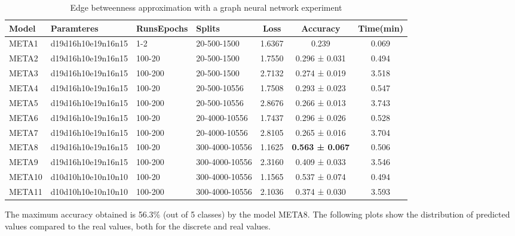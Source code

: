 \begin{table}[H]
\centering
\begin{tabular}{|llllccc|}
\hline
 Model &                                                                        Paramteres  &  Runs\/Epochs  &  Splits &    Loss &        Accuracy &  Time(min) \\
\hline
 META1 &          d19d16h10e19n16n15 & 1-2 & 20-500-1500 &  1.6367 &     0.239  &      0.069 \\
 META2 &       d19d16h10e19n16n15 & 100-20 & 20-500-1500 &  1.7550 &   0.296 ± 0.031 &      0.494 \\
 META3 &      d19d16h10e19n16n15 & 100-200 & 20-500-1500 &  2.7132 &   0.274 ± 0.019 &      3.518 \\
 META4 &      d19d16h10e19n16n15 & 100-20 & 20-500-10556 &  1.7508 &   0.293 ± 0.023 &      0.547 \\
 META5 &     d19d16h10e19n16n15 & 100-200 & 20-500-10556 &  2.8676 &   0.266 ± 0.013 &      3.743 \\
 META6 &     d19d16h10e19n16n15 & 100-20 & 20-4000-10556 &  1.7437 &   0.296 ± 0.026 &      0.528 \\
 META7 &    d19d16h10e19n16n15 & 100-200 & 20-4000-10556 &  2.8105 &   0.265 ± 0.016 &      3.704 \\
 META8 &    d19d16h10e19n16n15 & 100-20 & 300-4000-10556 &  1.1625 &   \textbf{0.563 ± 0.067} &      0.506 \\
 META9 &   d19d16h10e19n16n15 & 100-200 & 300-4000-10556 &  2.3160 &   0.409 ± 0.033 &      3.546 \\
 META10 &    d10d10h10e10n10n10 & 100-20 & 300-4000-10556 &  1.1565 &   0.537 ± 0.074 &      0.494 \\
 META11 &   d10d10h10e10n10n10 & 100-200 & 300-4000-10556 &  2.1036 &   0.374 ± 0.030 &      3.593 \\
\hline
\end{tabular}
\label{Experiment1}\caption{Edge betweenness approximation with a graph neural network experiment}
\end{table}

The maximum accuracy obtained is 56.3\% (out of 5 classes) by the model META8. The following plots show the distribution of predicted values compared to the real values, both for the discrete and real values.





